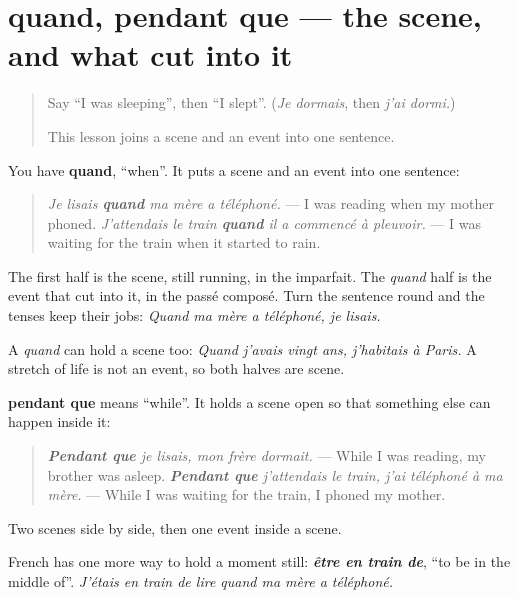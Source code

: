 \section[quand, pendant que]{quand, pendant que — the scene, and what cut into it}

\label{lesson:FR-C258-pendant-que}



\begin{quote}
Say \textquotedblleft{}I was sleeping\textquotedblright{}, then \textquotedblleft{}I slept\textquotedblright{}. (\emph{Je dormais}, then \emph{j'ai dormi.})

This lesson joins a scene and an event into one sentence.
\end{quote}

\begin{grammarlens}[title={Grammar Lens: quand, where the event comes in}]
You have \textbf{quand}, \textquotedblleft{}when\textquotedblright{}. It puts a scene and an event into one sentence:

\begin{quote}
\emph{Je lisais \textbf{quand} ma mère a téléphoné.} — I was reading when my mother phoned. \emph{J'attendais le train \textbf{quand} il a commencé à pleuvoir.} — I was waiting for the train when it started to rain.
\end{quote}

The first half is the scene, still running, in the imparfait. The \emph{quand} half is the event that cut into it, in the passé composé. Turn the sentence round and the tenses keep their jobs: \emph{Quand ma mère a téléphoné, je lisais.}

A \emph{quand} can hold a scene too: \emph{Quand j'avais vingt ans, j'habitais à Paris.} A stretch of life is not an event, so both halves are scene.
\end{grammarlens}

\begin{grammarlens}[title={Grammar Lens: pendant que, two things at once}]
\textbf{pendant que} means \textquotedblleft{}while\textquotedblright{}. It holds a scene open so that something else can happen inside it:

\begin{quote}
\emph{\textbf{Pendant que} je lisais, mon frère dormait.} — While I was reading, my brother was asleep. \emph{\textbf{Pendant que} j'attendais le train, j'ai téléphoné à ma mère.} — While I was waiting for the train, I phoned my mother.
\end{quote}

Two scenes side by side, then one event inside a scene.

French has one more way to hold a moment still: \emph{\textbf{être en train de}}, \textquotedblleft{}to be in the middle of\textquotedblright{}. \emph{J'étais en train de lire quand ma mère a téléphoné.}
\end{grammarlens}


